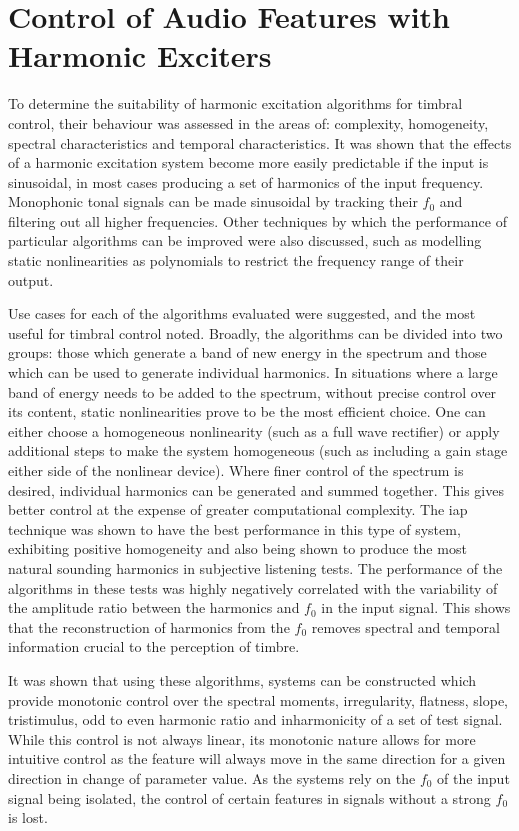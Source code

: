 \section{Control of Audio Features with Harmonic Exciters}
\label{sec:Conclusion-FeatureConrol}
	To determine the suitability of harmonic excitation algorithms for timbral control, their behaviour was assessed in
	the areas of: complexity, homogeneity, spectral characteristics and temporal characteristics. It was shown that the
	effects of a harmonic excitation system become more easily predictable if the input is sinusoidal, in most cases
	producing a set of harmonics of the input frequency. Monophonic tonal signals can be made sinusoidal by tracking
	their $f_{0}$ and filtering out all higher frequencies. Other techniques by which the performance of particular
	algorithms can be improved were also discussed, such as modelling static nonlinearities as polynomials to restrict
	the frequency range of their output.
	
	Use cases for each of the algorithms evaluated were suggested, and the most useful for timbral control noted.
	Broadly, the algorithms can be divided into two groups: those which generate a band of new energy in the spectrum
	and those which can be used to generate individual harmonics. In situations where a large band of energy needs to be
	added to the spectrum, without precise control over its content, static nonlinearities prove to be the most
	efficient choice. One can either choose a homogeneous nonlinearity (such as a full wave rectifier) or apply
	additional steps to make the system homogeneous (such as including a gain stage either side of the nonlinear
	device). Where finer control of the spectrum is desired, individual harmonics can be generated and summed together.
	This gives better control at the expense of greater computational complexity. The \acrshort{iap} technique was shown
	to have the best performance in this type of system, exhibiting positive homogeneity and also being shown to produce
	the most natural sounding harmonics in subjective listening tests. The performance of the algorithms in these tests
	was highly negatively correlated with the variability of the amplitude ratio between the harmonics and $f_{0}$ in
	the input signal. This shows that the reconstruction of harmonics from the $f_{0}$ removes spectral and temporal
	information crucial to the perception of timbre.

	It was shown that using these algorithms, systems can be constructed which provide monotonic control over the
	spectral moments, irregularity, flatness, slope, tristimulus, odd to even harmonic ratio and inharmonicity of a set
	of test signal. While this control is not always linear, its monotonic nature allows for more intuitive control as
	the feature will always move in the same direction for a given direction in change of parameter value. As the
	systems rely on the $f_{0}$ of the input signal being isolated, the control of certain features in signals without a
	strong $f_{0}$ is lost. 

